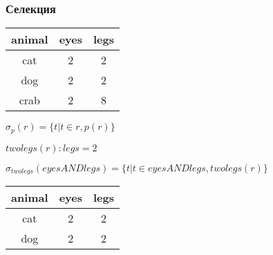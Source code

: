 \documentclass{beamer}
\begin{document}
\begin{frame}[fragile]
\frametitle{Селекция}

\begin{center}
\begin{tabular}{ c | c | c }
  animal  & eyes  & legs \\ \hline  
  cat  & 2  & 2 \\
  dog & 2 & 2 \\
  crab & 2 & 8 \\
\end{tabular} 
\end{center}

\pause

\begin{center}
  $\sigma_p(r) = \{t|t \in r,p(r)\}$
\end{center}

\pause

\begin{center}
  $twolegs(r):legs=2$

  $\sigma_{twolegs}(eyesANDlegs)=\{t|t \in eyesANDlegs,twolegs(r)\}$
\end{center}

\begin{center}
\begin{tabular}{ c | c | c }
  animal  & eyes  & legs \\ \hline  
  cat  & 2  & 2 \\
  dog & 2 & 2 \\
\end{tabular} 
\end{center}


\end{frame}
\end{document}
